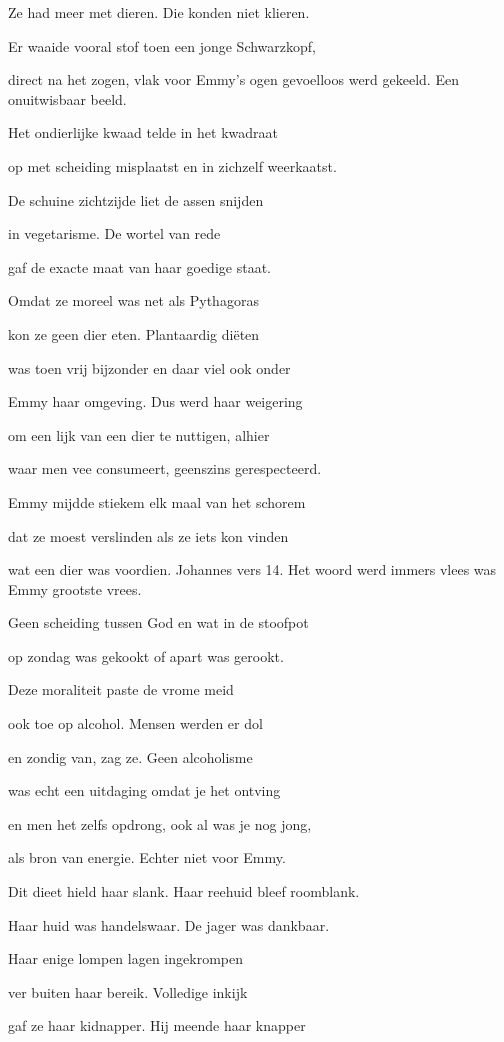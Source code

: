 Ze had meer met dieren.
Die konden niet klieren.

Er waaide vooral stof
toen een jonge Schwarzkopf,

direct na het zogen,
vlak voor Emmy’s ogen
gevoelloos werd gekeeld.
Een onuitwisbaar beeld.

Het ondierlijke kwaad
telde in het kwadraat

op met scheiding misplaatst
en in zichzelf weerkaatst.

De schuine zichtzijde
liet de assen snijden

in vegetarisme.
De wortel van rede

gaf de exacte maat
van haar goedige staat.

Omdat ze moreel was
net als Pythagoras

kon ze geen dier eten.
Plantaardig diëten

was toen vrij bijzonder
en daar viel ook onder

Emmy haar omgeving.
Dus werd haar weigering

om een lijk van een dier
te nuttigen, alhier

waar men vee consumeert,
geenszins gerespecteerd.

Emmy mijdde stiekem
elk maal van het schorem

dat ze moest verslinden
als ze iets kon vinden

wat een dier was voordien.
Johannes vers 14.
Het woord werd immers vlees
was Emmy grootste vrees.

Geen scheiding tussen God
en wat in de stoofpot

op zondag was gekookt
of apart was gerookt.

Deze moraliteit
paste de vrome meid

ook toe op alcohol.
Mensen werden er dol

en zondig van, zag ze.
Geen alcoholisme

was echt een uitdaging
omdat je het ontving

en men het zelfs opdrong,
ook al was je nog jong,

als bron van energie.
Echter niet voor Emmy.

Dit dieet hield haar slank.
Haar reehuid bleef roomblank.

Haar huid was handelswaar.
De jager was dankbaar.

Haar enige lompen
lagen ingekrompen

ver buiten haar bereik.
Volledige inkijk

gaf ze haar kidnapper.
Hij meende haar knapper

